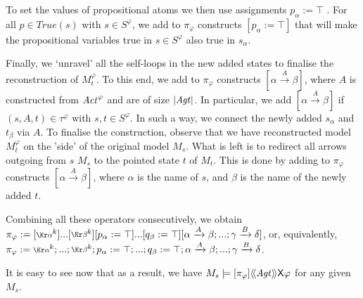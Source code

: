 {To set the values of propositional atoms we then use assignments $p_\alpha := \top$ . For all $p \in True(s)$ with $s \in S^\varphi$, we add to $\pi_\varphi$ constructs $[p_\alpha := \top]$ that will make the propositional variables true in $s \in S^\varphi$ also true in $s_\alpha$. 

Finally, we `unravel' all the self-loops in the new added states to finalise the reconstruction of $M^\varphi_t$.
To this end, we add to $\pi_\varphi$ constructs $[\alpha \xrightarrow{A} \beta]$, where $A$ is constructed from $\mathit{Act}^\varphi$ and are of size $|\mathit{Agt}|$. In particular, we add $[\alpha \xrightarrow{A} \beta]$ if $(s, A, t) \in \tau^\varphi$ with $s,t\in S^\varphi$. In such a way, we connect the newly added $s_\alpha$ and $t_\beta$ via $A$. To finalise the construction, observe that we have reconstructed model $M^\varphi_t$ on the 'side' of the original model $M_s$. What is left is to redirect all arrows outgoing from $s$ $M_s$ to the pointed state $t$ of $M_t$. This is done by adding to $\pi_\varphi$ constructs $[\alpha \xrightarrow{A} \beta]$, where $\alpha$ is the name of $s$, and $\beta$ is the name of the newly added $t$.   %

Combining all these operators consecutively, we obtain $\pi_\varphi:= [\lcirc{\alpha}^k]...[\lcirc{\beta}^k][p_\alpha := \top] ... [q_\beta := \top] [\alpha \xrightarrow{A} \beta;...;\gamma \xrightarrow{B} \delta]$, or, equivalently, $\pi_\varphi:= \lcirc{\alpha}^k;...;\lcirc{\beta}^k;p_\alpha := \top; ...; q_\beta := \top; \alpha \xrightarrow{A} \beta;...;\gamma \xrightarrow{B} \delta$. %

It is easy to see now that as a result, %
we have $M_s \models [\pi_\varphi]\langle \! \langle \mathit{Agt} \rangle \! \rangle \mathsf{X} \varphi$ for any given $M_s$.
}
\fi
